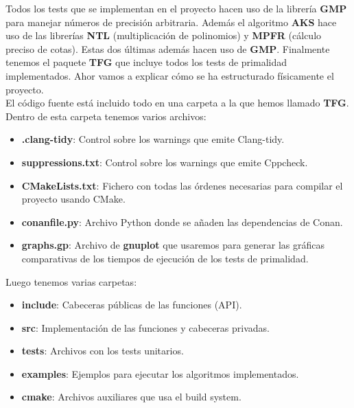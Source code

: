 Todos los tests que se implementan en el proyecto hacen uso de la librería \textbf{GMP} para manejar números de precisión arbitraria. Además el algoritmo \textbf{AKS} hace uso de las librerías \textbf{NTL} (multiplicación de polinomios) y \textbf{MPFR} (cálculo preciso de cotas). Estas dos últimas además hacen uso de \textbf{GMP}. Finalmente tenemos el paquete \textbf{TFG} que incluye todos los tests de primalidad implementados. Ahor vamos a explicar cómo se ha estructurado físicamente el proyecto.\\

El código fuente está incluido todo en una carpeta a la que hemos llamado \textbf{TFG}. Dentro de esta carpeta tenemos varios archivos:

\begin{itemize}
	\item \textbf{.clang-tidy}: Control sobre los warnings que emite Clang-tidy.
	
	\item \textbf{suppressions.txt}: Control sobre los warnings que emite Cppcheck.
	
	\item \textbf{CMakeLists.txt}: Fichero con todas las órdenes necesarias para compilar el proyecto usando CMake.

	\item \textbf{conanfile.py}: Archivo Python donde se añaden las dependencias de Conan.
	
	\item \textbf{graphs.gp}: Archivo de \textbf{gnuplot} que usaremos para generar las gráficas comparativas de los tiempos de ejecución de los tests de primalidad.
\end{itemize}

Luego tenemos varias carpetas:

\begin{itemize}
	\item \textbf{include}: Cabeceras públicas de las funciones (API).
	
	\item \textbf{src}: Implementación de las funciones y cabeceras privadas.
	
	\item \textbf{tests}: Archivos con los tests unitarios.
	
	\item \textbf{examples}: Ejemplos para ejecutar los algoritmos implementados.
	
	\item \textbf{cmake}: Archivos auxiliares que usa el build system.
\end{itemize}

